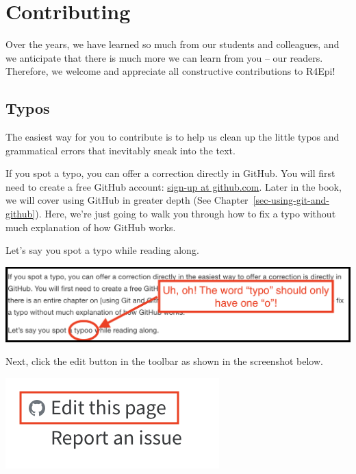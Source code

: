 \documentclass[
  letterpaper,
  DIV=11,
  numbers=noendperiod]{scrreprt}
\begin{document}

\chapter*{Contributing}\label{contributing}


Over the years, we have learned so much from our students and
colleagues, and we anticipate that there is much more we can learn from
you -- our readers. Therefore, we welcome and appreciate all
constructive contributions to R4Epi!

\section*{Typos}\label{typos}


The easiest way for you to contribute is to help us clean up the little
typos and grammatical errors that inevitably sneak into the text.

If you spot a typo, you can offer a correction directly in GitHub. You
will first need to create a free GitHub account:
\href{https://github.com/join}{sign-up at github.com}. Later in the
book, we will cover using GitHub in greater depth (See
Chapter~\ref{sec-using-git-and-github}). Here, we're just going to walk
you through how to fix a typo without much explanation of how GitHub
works.

Let's say you spot a typo while reading along.

\includegraphics{chapters/contributing/typo_on_screen.png}

Next, click the edit button in the toolbar as shown in the screenshot
below.

\includegraphics{chapters/contributing/edit_button.png}
\end{document}
